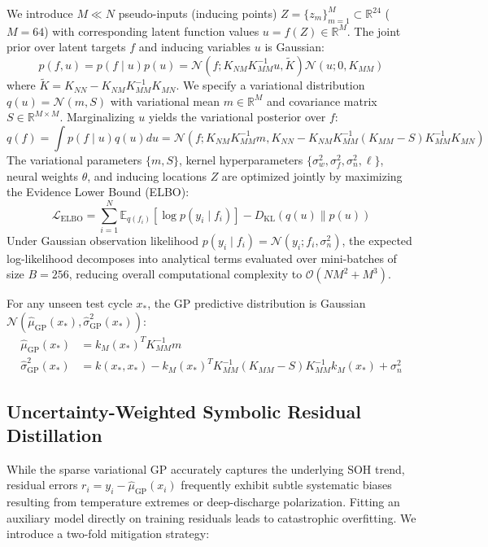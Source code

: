 \documentclass[a4paper,fleqn]{cas-sc}
\begin{document}
We introduce $M \ll N$ pseudo-inputs (inducing points) $Z = \{z_m\}_{m=1}^M \subset \mathbb{R}^{24}$ ($M=64$) with corresponding latent function values $u = f(Z) \in \mathbb{R}^M$. The joint prior over latent targets $f$ and inducing variables $u$ is Gaussian:
\begin{equation}
    p(f, u) = p(f \mid u) p(u) = \mathcal{N}\left(f; K_{NM} K_{MM}^{-1} u, \tilde{K}\right) \mathcal{N}(u; 0, K_{MM})
\end{equation}
where $\tilde{K} = K_{NN} - K_{NM} K_{MM}^{-1} K_{MN}$. We specify a variational distribution $q(u) = \mathcal{N}(m, S)$ with variational mean $m \in \mathbb{R}^M$ and covariance matrix $S \in \mathbb{R}^{M \times M}$. Marginalizing $u$ yields the variational posterior over $f$:
\begin{equation}
    q(f) = \int p(f \mid u) q(u) du = \mathcal{N}\left(f; K_{NM} K_{MM}^{-1} m, K_{NN} - K_{NM} K_{MM}^{-1}(K_{MM} - S)K_{MM}^{-1} K_{MN}\right)
\end{equation}
The variational parameters $\{m, S\}$, kernel hyperparameters $\{\sigma_w^2, \sigma_f^2, \sigma_n^2, \ell\}$, neural weights $\theta$, and inducing locations $Z$ are optimized jointly by maximizing the Evidence Lower Bound (ELBO):
\begin{equation}
    \mathcal{L}_{\text{ELBO}} = \sum_{i=1}^N \mathbb{E}_{q(f_i)} \left[ \log p(y_i \mid f_i) \right] - D_{\text{KL}}\left( q(u) \parallel p(u) \right)
\end{equation}
Under Gaussian observation likelihood $p(y_i \mid f_i) = \mathcal{N}(y_i; f_i, \sigma_n^2)$, the expected log-likelihood decomposes into analytical terms evaluated over mini-batches of size $B=256$, reducing overall computational complexity to $\mathcal{O}(NM^2 + M^3)$.

For any unseen test cycle $x_*$, the GP predictive distribution is Gaussian $\mathcal{N}(\hat{\mu}_{\text{GP}}(x_*), \hat{\sigma}_{\text{GP}}^2(x_*))$:
\begin{align}
    \hat{\mu}_{\text{GP}}(x_*) &= k_{M}(x_*)^T K_{MM}^{-1} m \\
    \hat{\sigma}_{\text{GP}}^2(x_*) &= k(x_*, x_*) - k_{M}(x_*)^T K_{MM}^{-1} (K_{MM} - S) K_{MM}^{-1} k_{M}(x_*) + \sigma_n^2
\end{align}

\subsection{Uncertainty-Weighted Symbolic Residual Distillation}
While the sparse variational GP accurately captures the underlying SOH trend, residual errors $r_i = y_i - \hat{\mu}_{\text{GP}}(x_i)$ frequently exhibit subtle systematic biases resulting from temperature extremes or deep-discharge polarization. Fitting an auxiliary model directly on training residuals leads to catastrophic overfitting. We introduce a two-fold mitigation strategy:
\end{document}
